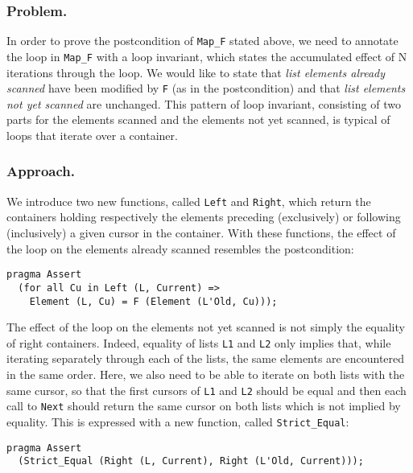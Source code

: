 \documentclass[runningheads,a4paper]{llncs}
\begin{document}
\subsubsection{Problem.}

In order to prove the postcondition of \verb|Map_F| stated above, we need to
annotate the loop in \verb|Map_F| with a loop invariant, which states the
accumulated effect of N iterations through the loop. We would like to state
that \emph{list elements already scanned} have been modified by \verb|F| (as in
the postcondition) and that \emph{list elements not yet scanned} are
unchanged. This pattern of loop invariant, consisting of two parts for the
elements scanned and the elements not yet scanned, is typical of loops that
iterate over a container.

\subsubsection{Approach.}

We introduce two new functions, called \verb|Left| and \verb|Right|, which
return the containers holding respectively the elements preceding (exclusively) or
following (inclusively) a given cursor in the container. With these functions, the effect of
the loop on the elements already scanned resembles the postcondition:
\begin{lstlisting}
pragma Assert 
  (for all Cu in Left (L, Current) => 
    Element (L, Cu) = F (Element (L'Old, Cu)));
\end{lstlisting}
The effect of the loop on the elements not yet scanned is not simply the
equality of right containers. Indeed, equality of lists \verb|L1| and \verb|L2|
only implies that, while iterating separately through each of the lists, the
same elements are encountered in the same order. Here, we also need to be able
to iterate on both lists with the same cursor, so that the first cursors of
\verb|L1| and \verb|L2| should be equal and then each call to \verb|Next|
should return the same cursor on both lists
which is not implied by equality.
This is expressed with a new
function, called \verb|Strict_Equal|:
\begin{lstlisting}
pragma Assert 
  (Strict_Equal (Right (L, Current), Right (L'Old, Current)));
\end{lstlisting}
\end{document}
